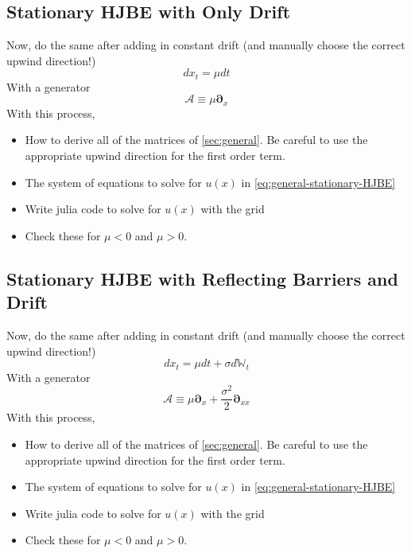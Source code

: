\documentclass[11pt]{article}
\newcommand{\D}[1][]{\ensuremath{\boldsymbol{\partial}_{#1}}}
\newcommand{\W}{\ensuremath{\mathbb{W}}}
\newcommand{\A}{\ensuremath{\mathcal{A}}}
\begin{document}
\subsection{Stationary HJBE with Only Drift}
Now, do the same after adding in constant drift (and manually choose the correct upwind direction!)
$$
d x_t = \mu dt
$$
With a generator
$$
	\A \equiv \mu \D[x]
$$
With this process,
\begin{itemize}
	\item How to derive all of the matrices of \cref{sec:general}.  Be careful to use the appropriate upwind direction for the first order term.
	\item The system of equations to solve for $u(x)$ in \cref{eq:general-stationary-HJBE}
	\item Write julia code to solve for $u(x)$ with the grid
	\item Check these for $\mu < 0$ and $\mu > 0$.
\end{itemize}


\subsection{Stationary HJBE with Reflecting Barriers and Drift}
Now, do the same after adding in constant drift (and manually choose the correct upwind direction!)
$$
d x_t = \mu dt + \sigma d\W_t
$$
With a generator
$$
	\A \equiv \mu \D[x] + \frac{\sigma^2}{2}\D[xx]
$$
With this process,
\begin{itemize}
	\item How to derive all of the matrices of \cref{sec:general}.  Be careful to use the appropriate upwind direction for the first order term.
	\item The system of equations to solve for $u(x)$ in \cref{eq:general-stationary-HJBE}
	\item Write julia code to solve for $u(x)$ with the grid
	\item Check these for $\mu < 0$ and $\mu > 0$.
\end{itemize}
\end{document}
